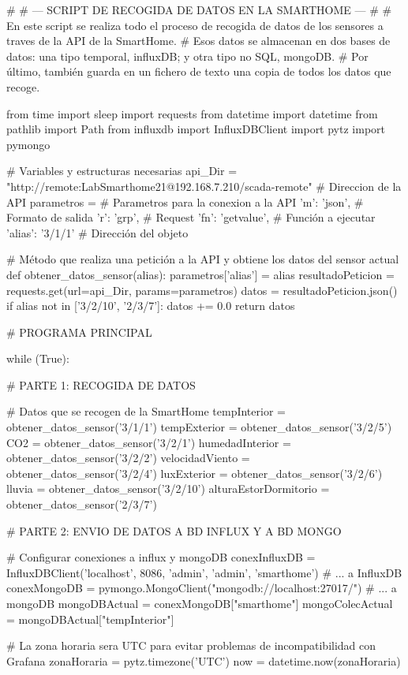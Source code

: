 \begin{python}
    #
# --- SCRIPT DE RECOGIDA DE DATOS EN LA SMARTHOME --- 
#
# En este script se realiza todo el proceso de recogida de datos de los sensores a traves de la API de la SmartHome.
# Esos datos se almacenan en dos bases de datos: una tipo temporal, influxDB; y otra tipo no SQL, mongoDB. 
# Por último, también guarda en un fichero de texto una copia de todos los datos que recoge.

from time import sleep
import requests
from datetime import datetime
from pathlib import Path
from influxdb import InfluxDBClient
import pytz
import pymongo

# Variables y estructuras necesarias
api_Dir = "http://remote:LabSmarthome21@192.168.7.210/scada-remote" # Direccion de la API
parametros = { # Parametros para la conexion a la API
    'm': 'json', # Formato de salida
    'r': 'grp', # Request
    'fn': 'getvalue', # Función a ejecutar
    'alias': '3/1/1' # Dirección del objeto
}

# Método que realiza una petición a la API y obtiene los datos del sensor actual
def obtener_datos_sensor(alias):
    parametros['alias'] = alias
    resultadoPeticion = requests.get(url=api_Dir, params=parametros)
    datos = resultadoPeticion.json()
    if alias not in ['3/2/10', '2/3/7']:
        datos += 0.0
    return datos

# PROGRAMA PRINCIPAL

while (True):

    # PARTE 1: RECOGIDA DE DATOS

    # Datos que se recogen de la SmartHome
    tempInterior = obtener_datos_sensor('3/1/1')
    tempExterior = obtener_datos_sensor('3/2/5')
    CO2 = obtener_datos_sensor('3/2/1')
    humedadInterior = obtener_datos_sensor('3/2/2')
    velocidadViento = obtener_datos_sensor('3/2/4')
    luxExterior = obtener_datos_sensor('3/2/6')
    lluvia = obtener_datos_sensor('3/2/10')
    alturaEstorDormitorio = obtener_datos_sensor('2/3/7')

    # PARTE 2: ENVIO DE DATOS A BD INFLUX Y A BD MONGO

    # Configurar conexiones a influx y mongoDB
    conexInfluxDB = InfluxDBClient('localhost', 8086, 'admin', 'admin', 'smarthome') # ... a InfluxDB
    conexMongoDB = pymongo.MongoClient("mongodb://localhost:27017/") # ... a mongoDB
    mongoDBActual = conexMongoDB["smarthome"]
    mongoColecActual = mongoDBActual["tempInterior"]

    # La zona horaria sera UTC para evitar problemas de incompatibilidad con Grafana
    zonaHoraria = pytz.timezone('UTC') 
    now = datetime.now(zonaHoraria)


\end{python}
